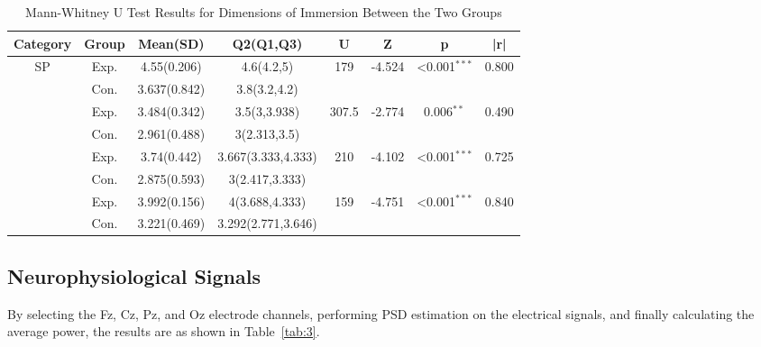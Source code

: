 \documentclass[runningheads]{llncs}
\begin{document}
\begin{table}[t]
\centering
\setlength{\tabcolsep}{2.4pt} %
\caption{Mann-Whitney U Test Results for Dimensions of Immersion Between the Two Groups}
\label{tab:immersion}
\begin{tabularx}{\textwidth}{cccccccc}
\toprule
\textbf{Category} & \textbf{Group} & \textbf{Mean(SD)} & \textbf{Q2(Q1,Q3)} & \textbf{U} & \textbf{Z} & \textbf{p} & \textbf{|r|} \\
\midrule
\multirow{2}{*}{SP} 
& Exp. & 4.55(0.206) & 4.6(4.2,5) & \multirow{2}{*}{179} & \multirow{2}{*}{-4.524} & \multirow{2}{*}{<0.001\(^{***}\)} & \multirow{2}{*}{0.800} \\
& Con. & 3.637(0.842) & 3.8(3.2,4.2) \\
\addlinespace
\multirow{2}{*}{Involvement} 
& Exp. & 3.484(0.342) & 3.5(3,3.938) & \multirow{2}{*}{307.5} & \multirow{2}{*}{-2.774} & \multirow{2}{*}{0.006\(^{**}\)} & \multirow{2}{*}{0.490} \\
& Con. & 2.961(0.488) & 3(2.313,3.5) \\
\addlinespace
\multirow{2}{*}{Realism} 
& Exp. & 3.74(0.442) & 3.667(3.333,4.333) & \multirow{2}{*}{210} & \multirow{2}{*}{-4.102} & \multirow{2}{*}{<0.001\(^{***}\)} & \multirow{2}{*}{0.725} \\
& Con. & 2.875(0.593) & 3(2.417,3.333) \\
\addlinespace
\multirow{2}{*}{Total} 
& Exp. & 3.992(0.156) & 4(3.688,4.333) & \multirow{2}{*}{159} & \multirow{2}{*}{-4.751} & \multirow{2}{*}{<0.001\(^{***}\)} & \multirow{2}{*}{0.840} \\
& Con. & 3.221(0.469) & 3.292(2.771,3.646) \\
\bottomrule
\end{tabularx}
\end{table}

\subsection{Neurophysiological Signals}
By selecting the Fz, Cz, Pz, and Oz electrode channels, performing PSD estimation on the electrical signals, and finally calculating the average power, the results are as shown in Table~\ref{tab:3}.
\end{document}
